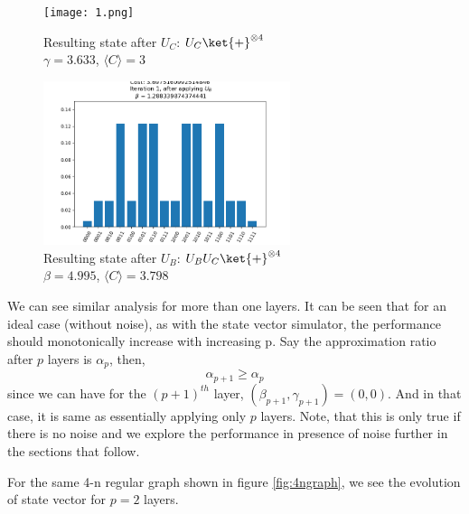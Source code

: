 \begin{figure}[H]
    \begin{minipage}{0.5\textwidth}
        \centering
        \texttt{[image: 1.png]}
        \caption{Resulting state after $U_C$: $U_C\ket{+}^{\otimes 4}$\\
                $\gamma = 3.633$, $\langle C \rangle =3$}
        \label{fig:UC1}
    \end{minipage}
    \begin{minipage}{0.5\textwidth}
        \centering
        \includegraphics[width=\textwidth, height= 4.8cm]{2.png}
        \caption{Resulting state after $U_B$: $U_BU_C\ket{+}^{\otimes 4}$\\
                $\beta = 4.995$, $\langle C \rangle =3.798$}
        \label{fig:UB1}
    \end{minipage}
\end{figure}

We can see similar analysis for more than one layers. It can be seen that for an ideal case (without noise), as with the state vector simulator, the performance should monotonically increase with increasing p.
Say the approximation ratio after $p$ layers is $\alpha_p$, then,
$$\alpha_{p+1} \geq \alpha_p$$
since we can have for the $(p+1)^{th}$ layer, $(\beta_{p+1}, \gamma_{p+1}) = (0, 0)$.
And in that case, it is same as essentially applying only $p$ layers.
Note, that this is only true if there is no noise and we explore the performance in presence of noise further in the sections that follow.

For the same 4-n regular graph shown in figure \ref{fig:4ngraph}, we see the evolution of state vector for $p = 2$ layers.

